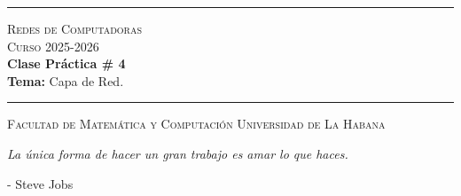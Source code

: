 \documentclass[12pt]{amsart}
\begin{document}
	\hrule
	\smallskip
	\begin{center}
		{\scshape {\large Redes de Computadoras} \\
			Curso 2025-2026} \\ \smallskip
		\textbf{Clase Práctica \# 4} \\
		{\small \textbf{Tema:} Capa de Red.}
	\end{center}
	\vspace{-8px}
	\rule{\linewidth}{2pt}
	
	{\scshape Facultad de Matemática y Computación}  \hfill {\scshape Universidad de La Habana}
	
	\bigskip\bigskip
	
	
	
	\vspace{1cm}
	
	\begin{center}
		\textit{La única forma de hacer un gran trabajo es amar lo que haces.}
	\end{center}
	
	\begin{flushright}
		- Steve Jobs
	\end{flushright}
	
	\vspace{1cm}
	
\end{document}
